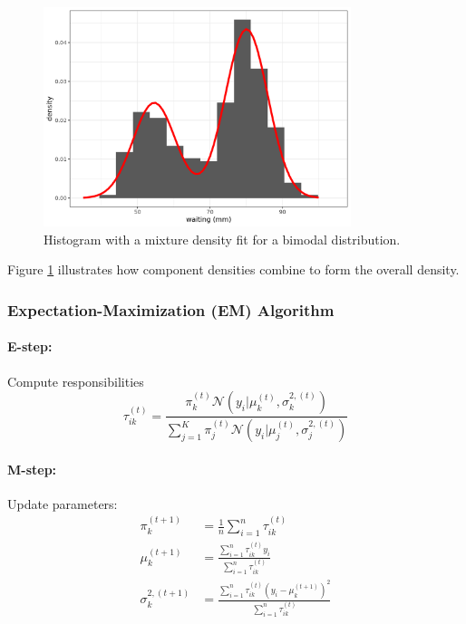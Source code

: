 \documentclass[11pt,a4paper]{article}
\begin{document}
\begin{figure}[htb]
    \centering
    \includegraphics[width=0.8\textwidth]{mixture-density.png}
    \caption{Histogram with a mixture density fit for a bimodal distribution.}
    \label{fig:mixture-density}
\end{figure}

Figure \ref{fig:mixture-density} illustrates how component densities combine to form the overall density.

\subsubsection{Expectation-Maximization (EM) Algorithm}

\paragraph{E-step:} Compute responsibilities  
\[
\tau_{ik}^{(t)} = \frac{\pi_k^{(t)} \mathcal{N}(y_i|\mu_k^{(t)}, \sigma_k^{2,(t)})}{\sum_{j=1}^K \pi_j^{(t)} \mathcal{N}(y_i|\mu_j^{(t)}, \sigma_j^{2,(t)})}
\]
\paragraph{M-step:} Update parameters:
\begin{align}
\pi_k^{(t+1)} &= \frac{1}{n}\sum_{i=1}^n \tau_{ik}^{(t)} \\
\mu_k^{(t+1)} &= \frac{\sum_{i=1}^n \tau_{ik}^{(t)} y_i}{\sum_{i=1}^n \tau_{ik}^{(t)}} \\
\sigma_k^{2,(t+1)} &= \frac{\sum_{i=1}^n \tau_{ik}^{(t)} (y_i - \mu_k^{(t+1)})^2}{\sum_{i=1}^n \tau_{ik}^{(t)}}
\end{align}
\end{document}
